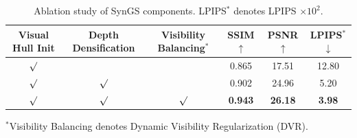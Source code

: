\begin{table}[!htbp]
\centering
\caption{\label{tab:ablation} Ablation study of SynGS components. LPIPS$^{*}$ denotes LPIPS $\times 10^{2}$.}
\setlength{\tabcolsep}{2.5mm}
\renewcommand{\arraystretch}{1.05}
\small
\begin{tabular}{@{}cccccc@{}}
\toprule
\scriptsize Visual Hull Init & \scriptsize Depth Densification & \scriptsize Visibility Balancing$^{*}$ & SSIM$\uparrow$ & PSNR$\uparrow$ & LPIPS$^{*}$$\downarrow$ \\
\midrule
$\surd$  &              &              & 0.865  & 17.51  & 12.80  \\
$\surd$  & $\surd$      &              & 0.902  & 24.96  & 5.20  \\
$\surd$  & $\surd$      & $\surd$      & \textbf{0.943} & \textbf{26.18} & \textbf{3.98} \\
\bottomrule
\end{tabular}

\vspace{0.3em}
{\footnotesize $^{*}$Visibility Balancing denotes Dynamic Visibility Regularization (DVR).}
\end{table}
